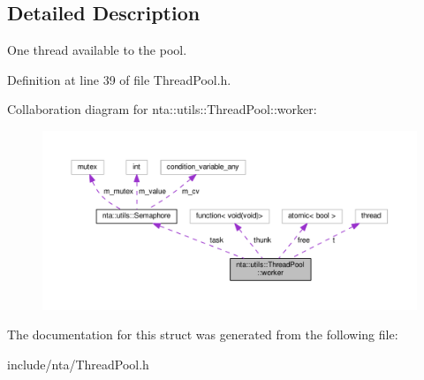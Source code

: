 \subsection{Detailed Description}
One thread available to the pool. 

Definition at line 39 of file Thread\+Pool.\+h.



Collaboration diagram for nta\+:\+:utils\+:\+:Thread\+Pool\+:\+:worker\+:\nopagebreak
\begin{figure}[H]
\begin{center}
\leavevmode
\includegraphics[width=350pt]{da/d21/structnta_1_1utils_1_1ThreadPool_1_1worker__coll__graph}
\end{center}
\end{figure}


The documentation for this struct was generated from the following file\+:\begin{DoxyCompactItemize}
\item 
include/nta/Thread\+Pool.\+h\end{DoxyCompactItemize}
